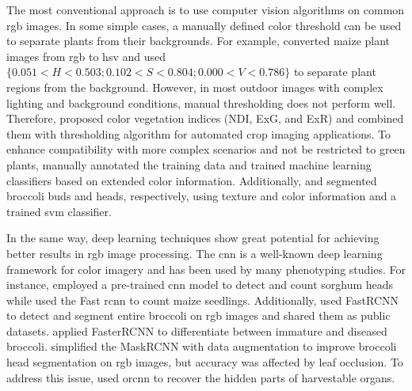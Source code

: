 
The most conventional approach is to use computer vision algorithms on common \gls{rgb} images. In some simple cases, a manually defined color threshold can be used to separate plants from their backgrounds. For example, \citet{choudhury_holistic_2018} converted maize plant images from \gls{rgb} to \gls{hsv} and used $\{ 0.051 < H < 0.503; 0.102 < S < 0.804; 0.000 < V < 0.786 \}$ to separate plant regions from the background. However, in most outdoor images with complex lighting and background conditions, manual thresholding does not perform well. Therefore, \citet{meyer_verification_2008} proposed color vegetation indices (NDI, ExG, and ExR) and combined them with \citet{otsu_threshold_1979} thresholding algorithm for automated crop imaging applications. To enhance compatibility with more complex scenarios and not be restricted to green plants, \citet{guo_easypcc_2017}  manually annotated the training data and trained machine learning classifiers based on extended color information. Additionally, \citet{zou_broccoli_2019} and \citet{blok_machine_2016} segmented broccoli buds and heads, respectively, using texture and color information and a trained \gls{svm} classifier.

In the same way, deep learning techniques show great potential for achieving better results in \gls{rgb} image processing. The \gls{cnn} is a well-known deep learning framework for color imagery and has been used by many phenotyping studies. For instance, \citet{ghosal_weakly_2019} employed a pre-trained \gls{cnn} model to detect and count sorghum heads while \citet{liu_estimating_2022} used the Fast \gls{rcnn} to count maize seedlings. Additionally, \citet{bender_high_2020} used FastRCNN to detect and segment entire broccoli on \gls{rgb} images and shared them as public datasets. \citet{garcia_towards_2021} applied FasterRCNN to differentiate between immature and diseased broccoli. \citet{blok_effect_2021} simplified the MaskRCNN with data augmentation to improve broccoli head segmentation on \gls{rgb} images, but accuracy was affected by leaf occlusion. To address this issue, \citet{blok_image_2021} used \gls{orcnn} to recover the hidden parts of harvestable organs.


